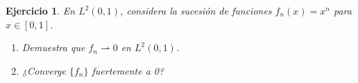 \documentclass[11pt]{report}
\newtheorem{ex}{Ejercicio}
\begin{document}
\begin{ex}
  En \( L^2(0,1) \), considera la sucesión de funciones \( f_n(x) = x^n \) para \( x \in [0,1] \).
  \begin{enumerate}
    \item Demuestra que \( f_n \rightharpoonup 0 \) en \( L^2(0,1) \).
    \item ¿Converge \( \{f_n\} \) fuertemente a 0?
  \end{enumerate}

\end{ex}
\end{document}

